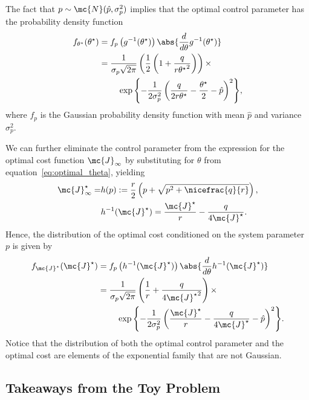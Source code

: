 %
The fact that $p \sim \mc{N}(\hat{p}, \sigma_p^2)$ implies that the optimal
control parameter has the probability density function
%
\begin{align*} 
    f_{\theta^\star}(\theta^\star) &= f_p\left(g^{-1}(\theta^\star)\right)
        \abs{\frac{d}{d\theta}g^{-1}(\theta^\star)} \\ &= \frac{1}{\sigma_p
        \sqrt{2\pi}}\left(\frac{1}{2}\left(1+\frac{q}{r{\theta^\star}^2}\right)\right)
        \times \\ &\hspace{8mm} \exp{\left\{-\frac{1}{2\sigma_p^2}\left(
        \frac{q}{2r\theta^\star} - \frac{\theta^\star}{2} - \hat{p}
        \right)^2\right\}}, 
\end{align*}
%
where $f_p$ is the Gaussian probability density function with mean $\hat{p}$ and
variance $\sigma_p^2$. 

We can further eliminate the control parameter from the
expression for the optimal cost function $\mc{J}_\infty$ by
substituting for $\theta$ from
equation~\eqref{eq:optimal_theta}, yielding 
%
\begin{align*}
\mc{J}_\infty^\star = &h(p) := \frac{r}{2}\left( p +
\sqrt{p^2 + \nicefrac{q}{r}} \right), \\
&h^{-1}(\mc{J}^\star) = \frac{\mc{J}^\star}{r} -
\frac{q}{4\mc{J}^\star}.
\end{align*}
%
Hence, the distribution of the optimal cost conditioned on the system parameter
$p$ is given by
%
\begin{align*} 
    f_{\mc{J}^\star}(\mc{J}^\star) &=
        f_p\left(h^{-1}(\mc{J}^\star)\right)
        \abs{\frac{d}{d\theta}h^{-1}(\mc{J}^\star)} \\ &= \frac{1}{\sigma_p
                \sqrt{2\pi}}\left(\frac{1}{r} +
                \frac{q}{4{\mc{J}^\star}^2}\right) \times \\ &\hspace{8mm}
                \exp{\left\{ -\frac{1}{2\sigma_p^2} \left(
        \frac{\mc{J}^\star}{r} - \frac{q}{4\mc{J}^\star} -
        \hat{p}\right)^2\right\}}.
\end{align*}
%
Notice that the distribution of both the optimal control parameter and the
optimal cost are elements of the exponential family that are not Gaussian. 


\subsection{Takeaways from the Toy Problem}

